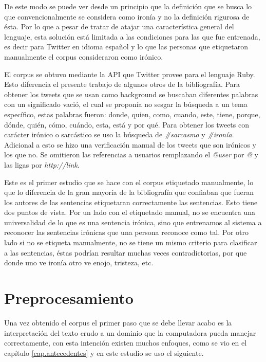 \par De este modo se puede ver desde un principio que la definición que se busca lo que convencionalmente se considera como ironía y no la definición rigurosa de ésta. Por lo que a pesar de tratar de atajar una característica general del lenguaje, esta solución está limitada a las condiciones para las que fue entrenada, es decir para Twitter en idioma español y lo que las personas que etiquetaron manualmente el corpus consideraron como irónico.

\par El corpus se obtuvo mediante la API que Twitter provee para el lenguaje Ruby. Esto diferencia el presente trabajo de algunos otros de la bibliografía. Para obtener los tweets que se usan como background se buscaban diferentes palabras con un significado vació, el cual se proponía no sesgar la búsqueda a un tema específico, estas palabras fueron: donde, quien, como, cuando, este, tiene, porque, dónde, quién, cómo, cuándo, esta, está y por qué. Para obtener los tweets con carácter irónico o sarcástico se uso la búsqueda de \textit{ \#sarcasmo} y \textit{\#ironía}. Adicional a esto se hizo una verificación manual de los tweets que son irónicos y los que no. Se omitieron las referencias a usuarios remplazando el \textit{@user} por \textit{@} y las ligas por \textit{http://link}.

\par Este es el primer estudio que se hace con el corpus etiquetado manualmente, lo que lo diferencia de la gran mayoría de la bibliografía que confiaban que fueran los autores de las sentencias etiquetaran correctamente las sentencias. Esto tiene dos puntos de vista. Por un lado con el etiquetado manual, no se encuentra una universalidad de lo que es una sentencia irónica, sino que entrenamos al sistema a reconocer las sentencias irónicas que una persona reconoce como tal. Por otro lado si no se etiqueta manualmente, no se tiene un mismo criterio para clasificar a las sentencias, éstas podrían resultar muchas veces contradictorias, por que donde uno ve ironía otro ve enojo, tristeza, etc.

\section{Preprocesamiento}
\par Una vez obtenido el corpus el primer paso que se debe llevar acabo es la interpretación del texto crudo a un dominio que la computadora pueda manejar correctamente, con esta intención existen muchos enfoques, como se vio en el capítulo \ref{cap.antecedentes} y en este estudio se uso el siguiente.
